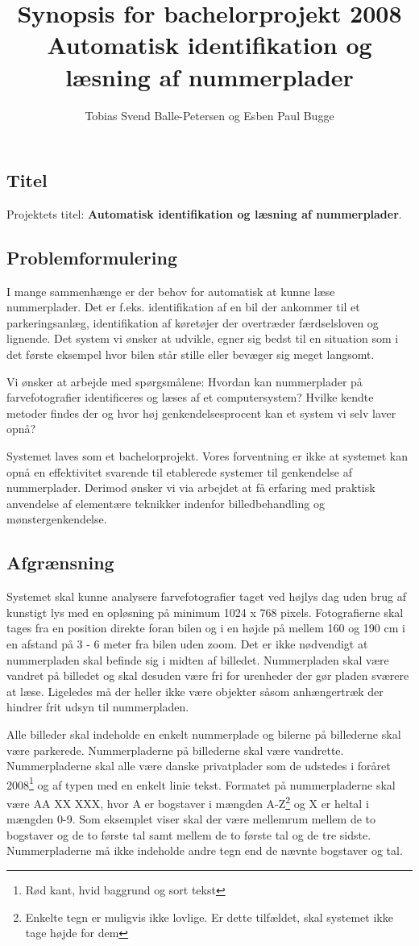 \documentclass[12pt,a4paper,final]{report}
\author{Tobias Svend Balle-Petersen og Esben Paul Bugge}
\title{Synopsis for bachelorprojekt 2008\\\large{Automatisk identifikation og læsning af nummerplader}}
\begin{document}
\maketitle

\subsection*{Titel}
Projektets titel: \textbf{Automatisk identifikation og læsning af nummerplader}.
\subsection*{Problemformulering}
I mange sammenhænge er der behov for automatisk at kunne læse nummerplader. Det er f.eks. identifikation af en bil der ankommer til et parkeringsanlæg, identifikation af køretøjer der overtræder færdselsloven og lignende. Det system vi ønsker at udvikle, egner sig bedst til en situation som i det første eksempel hvor bilen står stille eller bevæger sig meget langsomt.

Vi ønsker at arbejde med spørgsmålene: Hvordan kan nummerplader på farvefotografier identificeres og læses af et computersystem? Hvilke kendte metoder findes der og hvor høj genkendelsesprocent kan et system vi selv laver opnå?

Systemet laves som et bachelorprojekt. Vores forventning er ikke at systemet kan opnå en effektivitet svarende til etablerede systemer til genkendelse af nummerplader. Derimod ønsker vi via arbejdet at få erfaring med praktisk anvendelse af elementære teknikker indenfor billedbehandling og mønstergenkendelse. 


\subsection*{Afgrænsning}
Systemet skal kunne analysere farvefotografier taget ved højlys dag uden brug af kunstigt lys med en opløsning på minimum 1024 x 768 pixels. Fotografierne skal tages fra en position direkte foran bilen og i en højde på mellem 160 og 190 cm i en afstand på 3 - 6 meter fra bilen uden zoom. Det er ikke nødvendigt at nummerpladen skal befinde sig i midten af billedet. Nummerpladen skal være vandret på billedet og skal desuden være fri for urenheder der gør pladen sværere at læse. Ligeledes må der heller ikke være objekter såsom anhængertræk der hindrer frit udsyn til nummerpladen.

Alle billeder skal indeholde en enkelt nummerplade og bilerne på billederne skal være parkerede. Nummerpladerne på billederne skal være vandrette. Nummerpladerne skal alle være danske privatplader som de udstedes i foråret 2008\footnote{Rød kant, hvid baggrund og sort tekst} og af typen med en enkelt linie tekst. Formatet på nummerpladerne skal være AA XX XXX, hvor A er bogstaver i mængden A-Z\footnote{Enkelte tegn er muligvis ikke lovlige. Er dette tilfældet, skal systemet ikke tage højde for dem} og X er heltal i mængden 0-9. Som eksemplet viser skal der være mellemrum mellem de to bogstaver og de to første tal samt mellem de to første tal og de tre sidste. Nummerpladerne må ikke indeholde andre tegn end de nævnte bogstaver og tal.
\end{document}
